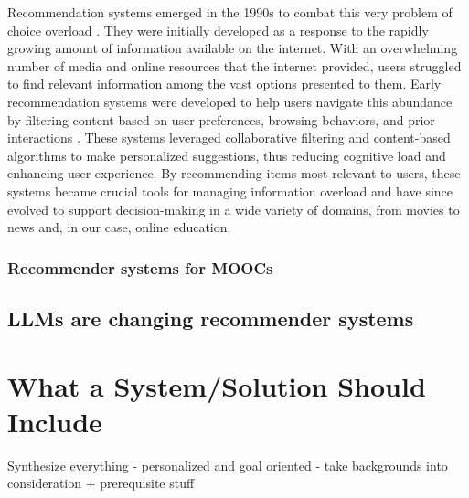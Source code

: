Recommendation systems emerged in the 1990s to combat this very problem of choice overload \cite{goldberg_using_1992}. They were initially developed as a response to the rapidly growing amount of information available on the internet. With an overwhelming number of media and online resources that the internet provided, users struggled to find relevant information among the vast options presented to them. Early recommendation systems were developed to help users navigate this abundance by filtering content based on user preferences, browsing behaviors, and prior interactions \cite{lutz_mafiaactive_1990}. These systems leveraged collaborative filtering and content-based algorithms to make personalized suggestions, thus reducing cognitive load and enhancing user experience. By recommending items most relevant to users, these systems became crucial tools for managing information overload and have since evolved to support decision-making in a wide variety of domains, from movies \cite{dong_brief_2022} to news \cite{resnick_grouplens_1994} and, in our case, online education.





 

\subsubsection{Recommender systems for MOOCs} 

\subsection{LLMs are changing recommender systems}

\section{What a System/Solution Should Include}

Synthesize everything 
- personalized and goal oriented
- take backgrounds into consideration + prerequisite stuff 
